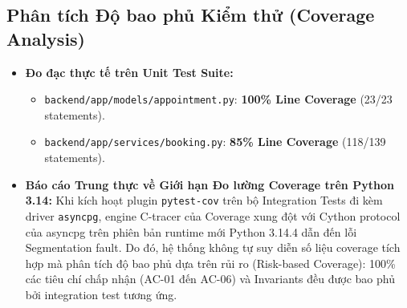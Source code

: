 \documentclass[10pt,a4paper]{article}
\newcommand{\codepath}[1]{{\ttfamily\scriptsize\nolinkurl{#1}}}
\begin{document}
\subsection{Phân tích Độ bao phủ Kiểm thử (Coverage Analysis)}
\begin{itemize}[leftmargin=1.1em,itemsep=0.2pt]
  \item \textbf{Đo đạc thực tế trên Unit Test Suite:}
    \begin{itemize}[leftmargin=0.9em,itemsep=0.1pt]
      \item \codepath{backend/app/models/appointment.py}: \textbf{100\% Line Coverage} (23/23 statements).
      \item \codepath{backend/app/services/booking.py}: \textbf{85\% Line Coverage} (118/139 statements).
    \end{itemize}
  \item \textbf{Báo cáo Trung thực về Giới hạn Đo lường Coverage trên Python 3.14:}
    Khi kích hoạt plugin \texttt{pytest-cov} trên bộ Integration Tests đi kèm driver \texttt{asyncpg}, engine C-tracer của Coverage xung đột với Cython protocol của asyncpg trên phiên bản runtime mới Python 3.14.4 dẫn đến lỗi Segmentation fault. Do đó, hệ thống không tự suy diễn số liệu coverage tích hợp mà phân tích độ bao phủ dựa trên rủi ro (Risk-based Coverage): 100\% các tiêu chí chấp nhận (AC-01 đến AC-06) và Invariants đều được bao phủ bởi integration test tương ứng.
\end{itemize}
\end{document}
